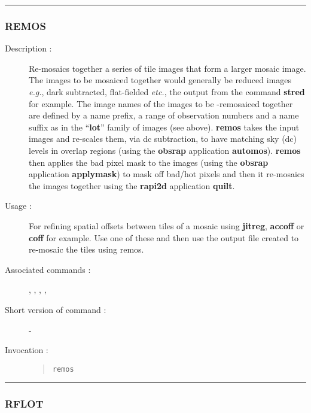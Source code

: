 \hrule 
\subsubsection*{\label{REMOS}REMOS}

\begin{description}

\item[Description :] Re-mosaics together a series of tile images that
form a larger mosaic image.  The images to be mosaiced together would
generally be reduced images \emph{e.g.}, dark subtracted, flat-fielded
\emph{etc.}, the output from the command {\bf stred} for example.  The
image names of the images to be -remosaiced together are defined by a
name prefix, a range of observation numbers and a name suffix as in the
``{\bf lot}'' family of images (see above).  {\bf remos} takes the
input images and re-scales them, via dc subtraction, to have matching
sky (dc) levels in overlap regions (using the {\bf obsrap} application
{\bf automos}).  {\bf remos} then applies the bad pixel mask to the
images (using the {\bf obsrap} application {\bf applymask}) to mask off
bad/hot pixels and then it re-mosaics the images together using the
{\bf rapi2d} application {\bf quilt}.

\item[Usage :] For refining spatial offsets between tiles of a
mosaic using {\bf jitreg}, {\bf accoff} or {\bf coff} for example.  Use one
of these and then use the output file created to re-mosaic the tiles
using remos.

\item[Associated commands :] {\tt {}}, 
{\tt {}}, {\tt {}}, 
{\tt {}}, {\tt {}}

\item[Short version of command :] -
\item[Invocation :]

\begin{quote}{\tt  remos }\end{quote}

\end{description}

\hrule 
\subsubsection*{\label{RFLOT}RFLOT}


